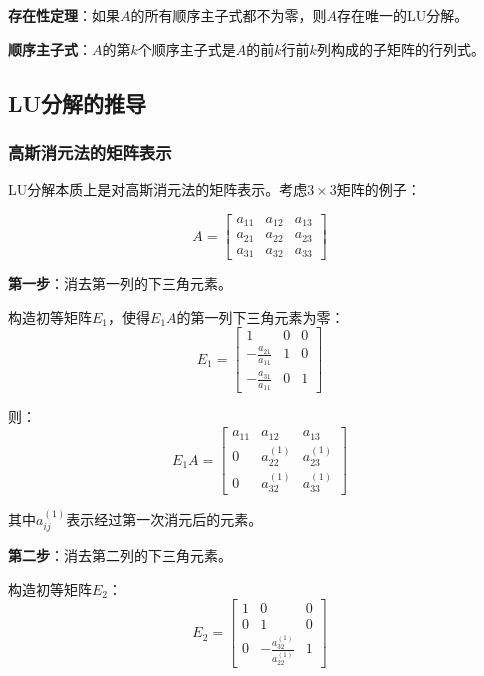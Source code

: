 \documentclass[12pt,a4paper]{article}
\begin{document}
\textbf{存在性定理}：如果$A$的所有顺序主子式都不为零，则$A$存在唯一的LU分解。

\textbf{顺序主子式}：$A$的第$k$个顺序主子式是$A$的前$k$行前$k$列构成的子矩阵的行列式。

\subsection{LU分解的推导}

\subsubsection{高斯消元法的矩阵表示}

LU分解本质上是对高斯消元法的矩阵表示。考虑$3 \times 3$矩阵的例子：

\begin{equation}
A = \begin{bmatrix} a_{11} & a_{12} & a_{13} \\ a_{21} & a_{22} & a_{23} \\ a_{31} & a_{32} & a_{33} \end{bmatrix}
\end{equation}

\textbf{第一步}：消去第一列的下三角元素。

构造初等矩阵$E_1$，使得$E_1 A$的第一列下三角元素为零：
\begin{equation}
E_1 = \begin{bmatrix} 1 & 0 & 0 \\ -\frac{a_{21}}{a_{11}} & 1 & 0 \\ -\frac{a_{31}}{a_{11}} & 0 & 1 \end{bmatrix}
\end{equation}

则：
\begin{equation}
E_1 A = \begin{bmatrix} a_{11} & a_{12} & a_{13} \\ 0 & a_{22}^{(1)} & a_{23}^{(1)} \\ 0 & a_{32}^{(1)} & a_{33}^{(1)} \end{bmatrix}
\end{equation}

其中$a_{ij}^{(1)}$表示经过第一次消元后的元素。

\textbf{第二步}：消去第二列的下三角元素。

构造初等矩阵$E_2$：
\begin{equation}
E_2 = \begin{bmatrix} 1 & 0 & 0 \\ 0 & 1 & 0 \\ 0 & -\frac{a_{32}^{(1)}}{a_{22}^{(1)}} & 1 \end{bmatrix}
\end{equation}
\end{document}
